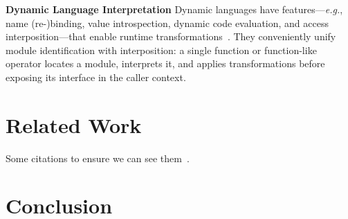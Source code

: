 \documentclass[letterpaper,twocolumn,10pt]{article}
\def\eg{{\em e.g.}, }
\newcommand{\heading}[1]{\vspace{2pt}\noindent\textbf{#1}\enspace}
\begin{document}
\heading{Dynamic Language Interpretation}
Dynamic languages have features---\eg name (re-)binding, value introspection, dynamic code evaluation, and access interposition---that enable runtime transformations~\cite{aop, metaobject}.
They conveniently unify module identification with interposition: %
  a single function or function-like operator locates a module, interprets it, and applies transformations before exposing its interface in the caller context.

\section{Related Work}
\label{rw}
Some citations to ensure we can see them~\cite{Christophe:2015:DAU:2819009.2819180, Keil:2013:EDA:2508168.2508176, Lehmann:2019:WFD:3297858.3304068, Sun:2018:EDA:3178372.3179527}.

\section{Conclusion}
\label{end}

% 



\end{document}
